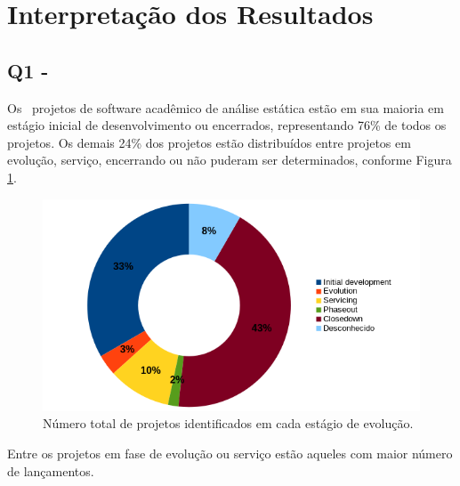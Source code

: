 
\section{Interpretação dos Resultados} \label{estudo3:interpretacao} %

\subsection{Q1 - \EstudoTresQuestaoUm}

Os \SoftwareCount \ projetos de software acadêmico de análise estática estão em
sua maioria em estágio inicial de desenvolvimento ou encerrados, representando
76\% de todos os projetos. Os demais 24\% dos projetos estão distribuídos entre
projetos em evolução, serviço, encerrando ou não puderam ser determinados,
conforme Figura \ref{life-cycle}.

\begin{figure}[h]
  \begin{minipage}{0.5\textwidth}
    \centering
    \includegraphics[scale=0.55]{imagens/life-cycle-pie.png}
  \end{minipage}
  \begin{minipage}{0.5\textwidth}
    \centering
    
  \end{minipage}
  \caption{Número total de projetos identificados em cada estágio de evolução.}
  \label{life-cycle}
\end{figure}

Entre os projetos em fase de evolução ou serviço estão aqueles com maior número
de lançamentos.

